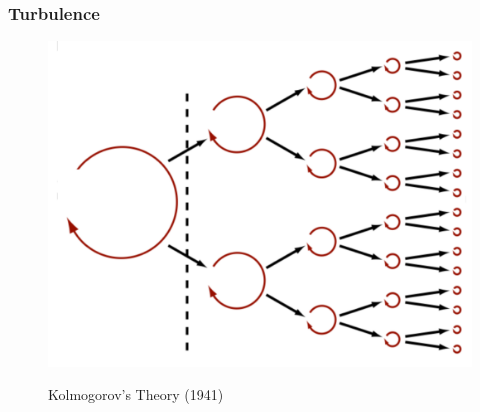 \documentclass{beamer}
\begin{document}

\begin{frame}
\frametitle{Turbulence}

        \begin{figure}
    \begin{center}
      \includegraphics[width=.70\linewidth]{k41.png}
    \end{center}
		\begin{center}
			Kolmogorov's Theory (1941)
		\end{center}
  \end{figure}


\end{frame}

\end{document}
